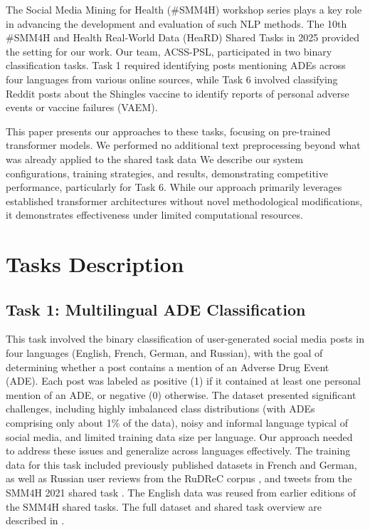 \documentclass[letterpaper]{article} %
\begin{document}
The Social Media Mining for Health (\#SMM4H) workshop series plays a key role in advancing the development and evaluation of such NLP methods.
The 10th \#SMM4H and Health Real-World Data (HeaRD) Shared Tasks in 2025 \cite{smm4h-heard-overview-2025} provided the setting for our work.
Our team, ACSS-PSL, participated in two binary classification tasks. Task 1 required identifying posts mentioning ADEs across four languages from various online sources, while Task 6 involved classifying Reddit posts about the Shingles vaccine to identify reports of personal adverse events or vaccine failures (VAEM).


This paper presents our approaches to these tasks, focusing on pre-trained transformer models. We performed no additional text preprocessing beyond what was already applied to the shared task data
We describe our system configurations, training strategies, and results, demonstrating competitive performance, particularly for Task 6. While our approach primarily leverages established transformer architectures without novel methodological modifications, it demonstrates effectiveness under limited computational resources.

\section{Tasks Description}

\subsection{Task 1: Multilingual ADE Classification}

This task involved the binary classification of user-generated social media posts in four languages (English, French, German, and Russian), with the goal of determining whether a post contains a mention of an Adverse Drug Event (ADE).
Each post was labeled as positive (1) if it contained at least one personal mention of an ADE, or negative (0) otherwise.
The dataset presented significant challenges, including highly imbalanced class distributions (with ADEs comprising only about 1\% of the data), noisy and informal language typical of social media, and limited training data size per language. Our approach needed to address these issues and generalize across languages effectively.
The training data for this task included previously published datasets in French and German, as well as Russian user reviews from the RuDReC corpus \cite{tutubalina2020russian}, and tweets from the SMM4H 2021 shared task \cite{magge-etal-2021-overview}. The English data was reused from earlier editions of the SMM4H shared tasks. The full dataset and shared task overview are described in \cite{smm4h-heard-overview-2025}.
\end{document}
